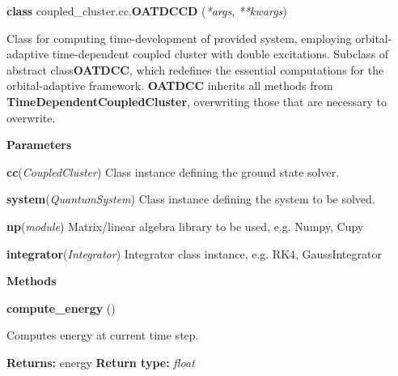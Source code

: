 \begin{tcolorbox}
    {\selectfont
    \textbf{class} coupled\_cluster.cc.\textbf{OATDCCD}
    (\emph{*args}, \emph{**kwargs})

    \vspace{1em}
    Class for computing time-development of provided system, employing orbital-adaptive 
    time-dependent coupled cluster with double excitations.   Subclass of abstract class\textbf{OATDCC}, which redefines the essential computations
    for the orbital-adaptive framework. \textbf{OATDCC} inherits all methods from 
    \textbf{TimeDependentCoupledCluster}, overwriting those that are necessary to overwrite.

    \vspace{1em}
    \textbf{Parameters}

    \hspace{2em}\textbf{cc}(\emph{CoupledCluster})
        Class instance defining the ground state solver.

    \hspace{2em}\textbf{system}(\emph{QuantumSystem}) 
        Class instance defining the system to be solved.

    \hspace{2em}\textbf{np}(\emph{module})
        Matrix/linear algebra library to be used, e.g. Numpy, Cupy
    
    \hspace{2em}\textbf{integrator}(\emph{Integrator})
        Integrator class instance, e.g. RK4, GaussIntegrator

    \vspace{1em}
    \textbf{Methods}

    \hspace{2em} \textbf{compute\_energy} ()
        \begin{adjustwidth}{4em}{}
        Computes energy at current time step.

        \textbf{Returns:} energy
        \textbf{Return type:} \emph{float}
        \end{adjustwidth}

    }
\end{tcolorbox}
